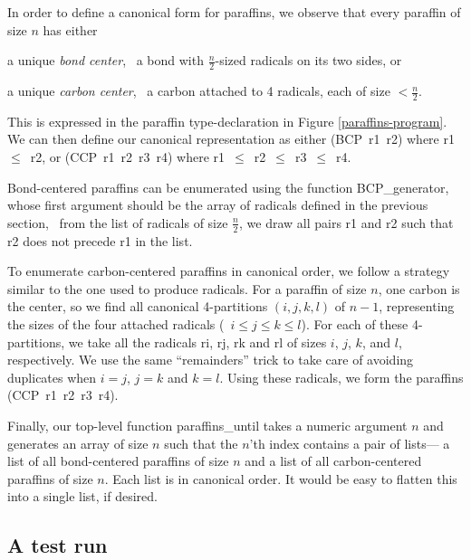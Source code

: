 In order to define a canonical form for paraffins, we observe that
every paraffin of size $n$ has either

\begin{tightlist}

\item a unique {\em bond center\/}, \ie\  a bond with $\frac{n}{2}$-sized
radicals on its two sides, or

\item a unique {\em carbon center\/}, \ie\ a carbon attached to 4 radicals,
each of size $< \frac{n}{2}$.

\end{tightlist}

This is expressed in the {\cf paraffin} type-declaration in Figure
\ref{paraffins-program}.   We can then define our canonical representation as either \mbox{\cf (BCP r1
r2)} where \mbox{\cf r1 $\leq$ r2}, or \mbox{\cf (CCP r1 r2 r3 r4)}
where \mbox{\cf r1 $\leq$ r2 $\leq$ r3 $\leq$ r4}.

Bond-centered paraffins can be enumerated using the function {\cf
BCP\_generator}, whose first argument should be the array of radicals
defined in the previous section, \ie\ from the list of radicals of
size $\frac{n}{2}$, we draw all pairs {\cf r1} and {\cf r2} such that
{\cf r2} does not precede {\cf r1} in the list.

To enumerate carbon-centered paraffins in canonical order, we follow a
strategy similar to the one used to produce radicals.  For a paraffin
of size $n$, one carbon is the center, so we find all canonical
4-partitions $(i,j,k,l)$ of $n-1$, representing the sizes of the four
attached radicals (\ie\ $i \leq j \leq k \leq l$).  For each of these
4-partitions, we take all the radicals {\cf ri}, {\cf rj}, {\cf rk}
and {\cf rl} of sizes $i$, $j$, $k$, and $l$, respectively.  We use
the same ``remainders'' trick to take care of avoiding duplicates when
$i=j$, $j=k$ and $k=l$.  Using these radicals, we form the paraffins
\mbox{\cf (CCP r1 r2 r3 r4)}.

Finally, our top-level function {\cf paraffins\_until} takes a numeric
argument $n$ and generates an array of size $n$ such that the $n$'th
index contains a pair of lists--- a list of all bond-centered
paraffins of size $n$ and a list of all carbon-centered paraffins of
size $n$. Each list is in canonical order.  It would be easy to
flatten this into a single list, if desired.

\subsection{A test run}

